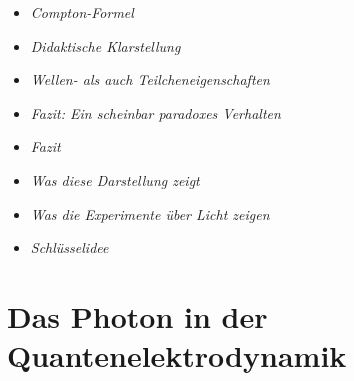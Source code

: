 \medskip
\begin{tcolorbox}[title=mathematische Boxen,mathebox]

\begin{itemize}
	\item \emph{Compton-Formel} \dotfill\pageref{box:comptonFormel}
\end{itemize}
\end{tcolorbox}

\medskip
\begin{tcolorbox}[title=didaktische Boxen,didaktikbox]
\begin{itemize}
	\item \emph{Didaktische Klarstellung}\dotfill\pageref{box:didaktischeKlarstellung}
	\item \emph{Wellen- als auch Teilcheneigenschaften} \dotfill\pageref{box:wellen}
	\item \emph{Fazit: Ein scheinbar paradoxes Verhalten} \dotfill\pageref{box:Fazit ein scheinbarer}
\end{itemize}
\end{tcolorbox}

\medskip
\begin{tcolorbox}[title=Hinweisboxen,hinweisbox]
\begin{itemize}
	\item \emph{Fazit} \dotfill\pageref{box:fazit der photo}
	\item \emph{Was diese Darstellung zeigt} \dotfill\pageref{box:was diese Darstellun}
	\item \emph{Was die Experimente über Licht zeigen} \dotfill\pageref{box:was die Experimente}
\end{itemize}
\end{tcolorbox}

\medskip
\begin{tcolorbox}[title=hypothetisch Boxen,hypobox]
\begin{itemize}
	\item \emph{Schlüsselidee}\dotfill\pageref{box:schlüsselidee}
\end{itemize}
\end{tcolorbox}




\section{Das Photon in der Quantenelektrodynamik}


